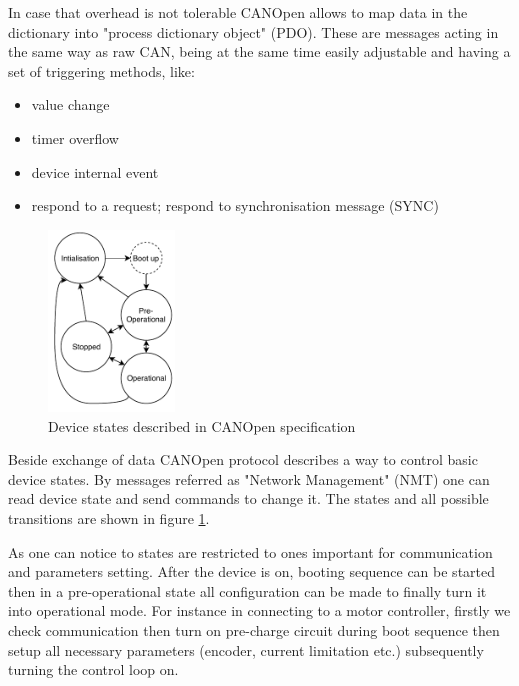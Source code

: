 In case that overhead is not tolerable CANOpen allows to map data in the dictionary into "process dictionary object" (PDO). These are messages acting in the same way as raw CAN, being at the same time easily adjustable and having a set of triggering methods, like:
\begin{itemize}
    \item value change
    \item timer overflow
    \item device internal event
    \item respond to a request; respond to synchronisation message (SYNC)
\end{itemize}

\begin{figure}
    \vspace{-0.9cm}
    \centering
    \includegraphics[width=0.3\textwidth]{figures/CANOpen_NMT}
    \vspace{-0.5cm}
    \caption{Device states described in CANOpen specification}
    \label{fig:CANOpen NMT}
    \vspace{-0.5cm}
\end{figure}
Beside exchange of data CANOpen protocol describes a way to control basic device states. By messages referred as "Network Management" (NMT) one can read device state and send commands to change it. The states and all possible transitions are shown in figure \ref{fig:CANOpen NMT}.

As one can notice to states are restricted to ones important for communication and parameters setting. After the device is on, booting sequence can be started then in a pre-operational state all configuration can be made to finally turn it into operational mode. For instance in connecting to a motor controller, firstly we check communication then turn on pre-charge circuit during boot sequence then setup all necessary parameters (encoder, current limitation etc.) subsequently turning the control loop on.

